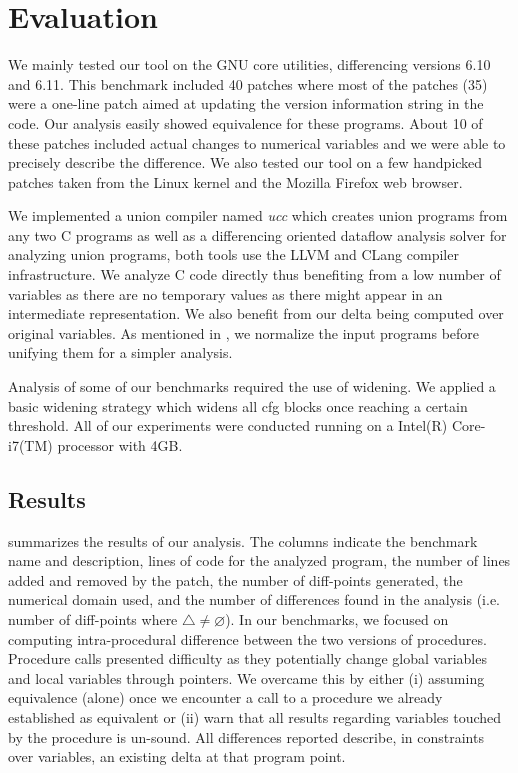 \section{Evaluation}\label{Se:Evaluation}
We mainly tested our tool on the GNU core utilities, differencing versions 6.10 and 6.11. This benchmark included 40 patches where most of the patches (35) were a one-line patch aimed at updating the version information string in the code. Our analysis easily showed equivalence for these programs. About 10 of these patches included actual changes to numerical variables and we were able to precisely describe the difference. We also tested our tool on a few handpicked patches taken from the Linux kernel and the Mozilla Firefox web browser.

We implemented a union compiler named \emph{ucc} which creates union programs from any two C programs as well as a differencing oriented dataflow analysis solver for analyzing union programs, both tools use the LLVM and CLang compiler infrastructure. We analyze C code directly thus benefiting from a low number of variables as there are no temporary values as there might appear in an intermediate representation. We also benefit from our delta being computed over original variables. As mentioned in , we normalize the input programs before unifying them for a simpler analysis.

Analysis of some of our benchmarks required the use of widening. We applied a basic widening strategy which widens all cfg blocks once reaching a certain threshold. All of our experiments were conducted running on a Intel(R) Core-i7(TM) processor with 4GB.

\subsection{Results}



 summarizes the results of our analysis. The columns indicate the benchmark name and description, lines of code for the analyzed program, the number of lines added and removed by the patch, the number of diff-points generated, the numerical domain used, and the number of differences found in the analysis (i.e. number of diff-points where $\triangle \neq \varnothing$). In our benchmarks, we focused on computing intra-procedural difference between the two versions of procedures. Procedure calls presented difficulty as they potentially change global variables and local variables through pointers. We overcame this by either (i) assuming equivalence (alone) once we encounter a call to a procedure we already established as equivalent or (ii) warn that all results regarding variables touched by the procedure is un-sound.  All differences reported describe, in constraints over variables, an existing delta at that program point.

